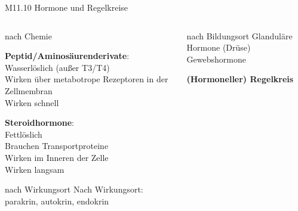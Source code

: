 \documentclass{beamer}
\begin{document}



\begin{frame}{M11.10 Hormone und Regelkreise}


\begin{columns}[c]

\begin{column}{5cm}

\begin{block}{nach Chemie}

 \textbf{Peptid/Aminosäurenderivate}: \\
 Wasserlöslich (außer T3/T4) \\
 Wirken über metabotrope Rezeptoren in der Zellmembran  \\
 Wirken schnell
 
\textbf{Steroidhormone}: \\
Fettlöslich \\
Brauchen Transportproteine \\
Wirken im Inneren der Zelle \\
Wirken langsam \\


\end{block}

\begin{block}{nach Wirkungsort}
Nach Wirkungsort: parakrin, autokrin, endokrin
\end{block}



\end{column}


\begin{column}{6cm}

\begin{block}{nach Bildungsort}
Glanduläre Hormone (Drüse) \\
Gewebshormone
\end{block}

\pause

\textbf{(Hormoneller) Regelkreis}


\end{column}
\end{columns}
\end{frame}
\end{document}
